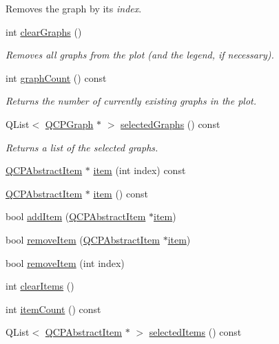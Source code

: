 \begin{DoxyCompactItemize}
\begin{DoxyCompactList}
Removes the graph by its {\itshape index}. \end{DoxyCompactList}\item 
int \hyperlink{a00116_ab0f3abff2d2f7df3668b5836f39207fa}{clear\+Graphs} ()
\begin{DoxyCompactList}\small\item\em Removes all graphs from the plot (and the legend, if necessary). \end{DoxyCompactList}\item 
int \hyperlink{a00116_a7d9b4d19114b2fde60f0233eeb0aa682}{graph\+Count} () const 
\begin{DoxyCompactList}\small\item\em Returns the number of currently existing graphs in the plot. \end{DoxyCompactList}\item 
Q\+List$<$ \hyperlink{a00031}{Q\+C\+P\+Graph} $\ast$ $>$ \hyperlink{a00116_ad2a0493bdd01e7aa99a4209ae3a5b67b}{selected\+Graphs} () const 
\begin{DoxyCompactList}\small\item\em Returns a list of the selected graphs. \end{DoxyCompactList}\item 
\hyperlink{a00022}{Q\+C\+P\+Abstract\+Item} $\ast$ \hyperlink{a00116_aac743a709d025448e36cb65c9117d64b}{item} (int index) const 
\item 
\hyperlink{a00022}{Q\+C\+P\+Abstract\+Item} $\ast$ \hyperlink{a00116_a1138cb2d142c23006e7901494e256774}{item} () const 
\item 
bool \hyperlink{a00116_a5207a6de1832fa2c156c9e0338e49810}{add\+Item} (\hyperlink{a00022}{Q\+C\+P\+Abstract\+Item} $\ast$\hyperlink{a00116_a1138cb2d142c23006e7901494e256774}{item})
\item 
bool \hyperlink{a00116_ae68a4ab305034c0fe733a95704e4db5e}{remove\+Item} (\hyperlink{a00022}{Q\+C\+P\+Abstract\+Item} $\ast$\hyperlink{a00116_a1138cb2d142c23006e7901494e256774}{item})
\item 
bool \hyperlink{a00116_a9b4f548817271ab013fda5d06fec8fa6}{remove\+Item} (int index)
\item 
int \hyperlink{a00116_a9d204691a56aadcba8365a49637fa145}{clear\+Items} ()
\item 
int \hyperlink{a00116_a7ec4c2b995ae77fc3ecade97c42c52e0}{item\+Count} () const 
\item 
Q\+List$<$ \hyperlink{a00022}{Q\+C\+P\+Abstract\+Item} $\ast$ $>$ \hyperlink{a00116_a3714adb0a26b8cf1bd70740a7ea464c4}{selected\+Items} () const 

\end{DoxyCompactItemize}
